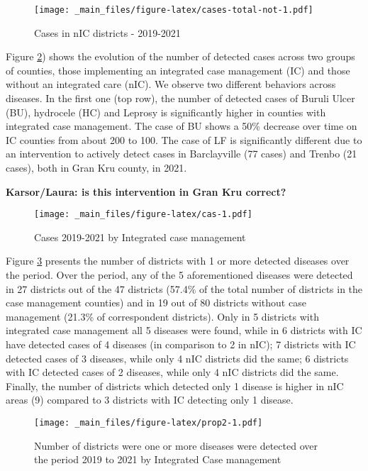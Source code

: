 \documentclass[
]{article}
\begin{document}
\begin{figure}
\centering
\texttt{[image: \_main\_files/figure-latex/cases-total-not-1.pdf]}
\caption{\label{fig:cases-total-not}Cases in nIC districts - 2019-2021}
\end{figure}

Figure \ref{fig:cas}) shows the evolution of the number of detected cases across two groups of counties, those implementing an integrated case management (IC) and those without an integrated care (nIC). We observe two different behaviors across diseases. In the first one (top row), the number of detected cases of Buruli Ulcer (BU), hydrocele (HC) and Leprosy is significantly higher in counties with integrated case management. The case of BU shows a 50\% decrease over time on IC counties from about 200 to 100. The case of LF is significantly different due to an intervention to actively detect cases in Barclayville (77 cases) and Trenbo (21 cases), both in Gran Kru county, in 2021.

\textbf{Karsor/Laura: is this intervention in Gran Kru correct?}

\begin{figure}
\centering
\texttt{[image: \_main\_files/figure-latex/cas-1.pdf]}
\caption{\label{fig:cas}Cases 2019-2021 by Integrated case management}
\end{figure}

Figure \ref{fig:prop2} presents the number of districts with 1 or more detected diseases over the period. Over the period, any of the 5 aforementioned diseases were detected in 27 districts out of the 47 districts (57.4\% of the total number of districts in the case management counties) and in 19 out of 80 districts without case management (21.3\% of correspondent districts). Only in 5 districts with integrated case management all 5 diseases were found, while in 6 districts with IC have detected cases of 4 diseases (in comparison to 2 in nIC); 7 districts with IC detected cases of 3 diseases, while only 4 nIC districts did the same; 6 districts with IC detected cases of 2 diseases, while only 4 nIC districts did the same. Finally, the number of districts which detected only 1 disease is higher in nIC areas (9) compared to 3 districts with IC detecting only 1 disease.

\begin{figure}
\centering
\texttt{[image: \_main\_files/figure-latex/prop2-1.pdf]}
\caption{\label{fig:prop2}Number of districts were one or more diseases were detected over the period 2019 to 2021 by Integrated Case management}
\end{figure}
\end{document}
